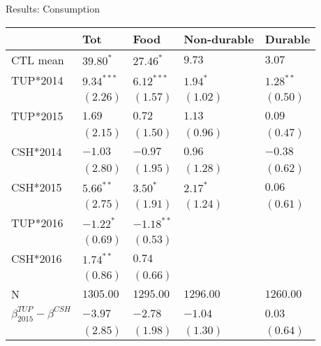 \documentclass[t,presentation]{beamer}
\begin{document}
\begin{frame}[label={sec:orgheadline14}]{Results: Consumption}
\begin{center}
\begin{tabular}{lllll}
\hline
 & Tot & Food & Non-durable & Durable\\
\hline
CTL mean & \(39.80^{*}\) & \(27.46^{*}\) & \(9.73\) & \(3.07\)\\
\hline
TUP*2014 & \(9.34^{***}\) & \(6.12^{***}\) & \(1.94^{*}\) & \(1.28^{**}\)\\
 & \(( 2.26)\) & \(( 1.57)\) & \(( 1.02)\) & \(( 0.50)\)\\
TUP*2015 & \(1.69\) & \(0.72\) & \(1.13\) & \(0.09\)\\
 & \(( 2.15)\) & \(( 1.50)\) & \(( 0.96)\) & \(( 0.47)\)\\
CSH*2014 & \(-1.03\) & \(-0.97\) & \(0.96\) & \(-0.38\)\\
 & \(( 2.80)\) & \(( 1.95)\) & \(( 1.28)\) & \(( 0.62)\)\\
CSH*2015 & \(5.66^{**}\) & \(3.50^{*}\) & \(2.17^{*}\) & \(0.06\)\\
 & \(( 2.75)\) & \(( 1.91)\) & \(( 1.24)\) & \(( 0.61)\)\\
TUP*2016 & \(-1.22^{*}\) & \(-1.18^{**}\) &  & \\
 & \(( 0.69)\) & \(( 0.53)\) &  & \\
CSH*2016 & \(1.74^{**}\) & \(0.74\) &  & \\
 & \(( 0.86)\) & \(( 0.66)\) &  & \\
\hline
N & \(1305.00\) & \(1295.00\) & \(1296.00\) & \(1260.00\)\\
\hline
\(\beta^{TUP}_{2015}-\beta^{CSH}\) & \(-3.97\) & \(-2.78\) & \(-1.04\) & \(0.03\)\\
 & \(( 2.85)\) & \(( 1.98)\) & \(( 1.30)\) & \(( 0.64)\)\\
\hline
\end{tabular}
\end{center}
\end{frame}
\end{document}
